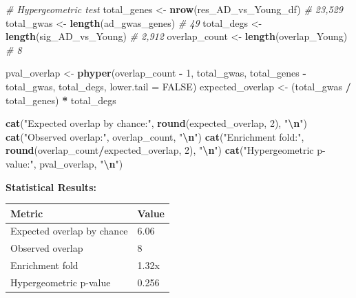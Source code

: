 \documentclass[
]{article}
\newenvironment{Shaded}{\begin{snugshade}}{\end{snugshade}}
\newcommand{\AttributeTok}[1]{\textcolor[rgb]{0.13,0.29,0.53}{#1}}
\newcommand{\CommentTok}[1]{\textcolor[rgb]{0.56,0.35,0.01}{\textit{#1}}}
\newcommand{\ConstantTok}[1]{\textcolor[rgb]{0.56,0.35,0.01}{#1}}
\newcommand{\DecValTok}[1]{\textcolor[rgb]{0.00,0.00,0.81}{#1}}
\newcommand{\FunctionTok}[1]{\textcolor[rgb]{0.13,0.29,0.53}{\textbf{#1}}}
\newcommand{\NormalTok}[1]{#1}
\newcommand{\OtherTok}[1]{\textcolor[rgb]{0.56,0.35,0.01}{#1}}
\newcommand{\SpecialCharTok}[1]{\textcolor[rgb]{0.81,0.36,0.00}{\textbf{#1}}}
\newcommand{\StringTok}[1]{\textcolor[rgb]{0.31,0.60,0.02}{#1}}
\begin{document}
\begin{Shaded}
\begin{Highlighting}[]
\CommentTok{\# Hypergeometric test}
\NormalTok{total\_genes   }\OtherTok{\textless{}{-}} \FunctionTok{nrow}\NormalTok{(res\_AD\_vs\_Young\_df)  }\CommentTok{\# 23,529}
\NormalTok{total\_gwas    }\OtherTok{\textless{}{-}} \FunctionTok{length}\NormalTok{(ad\_gwas\_genes)      }\CommentTok{\# 49}
\NormalTok{total\_degs    }\OtherTok{\textless{}{-}} \FunctionTok{length}\NormalTok{(sig\_AD\_vs\_Young)    }\CommentTok{\# 2,912}
\NormalTok{overlap\_count }\OtherTok{\textless{}{-}} \FunctionTok{length}\NormalTok{(overlap\_Young)      }\CommentTok{\# 8}

\NormalTok{pval\_overlap     }\OtherTok{\textless{}{-}} \FunctionTok{phyper}\NormalTok{(overlap\_count }\SpecialCharTok{{-}} \DecValTok{1}\NormalTok{, total\_gwas,}
\NormalTok{                            total\_genes }\SpecialCharTok{{-}}\NormalTok{ total\_gwas,}
\NormalTok{                            total\_degs, }\AttributeTok{lower.tail =} \ConstantTok{FALSE}\NormalTok{)}
\NormalTok{expected\_overlap }\OtherTok{\textless{}{-}}\NormalTok{ (total\_gwas }\SpecialCharTok{/}\NormalTok{ total\_genes) }\SpecialCharTok{*}\NormalTok{ total\_degs}

\FunctionTok{cat}\NormalTok{(}\StringTok{"Expected overlap by chance:"}\NormalTok{, }\FunctionTok{round}\NormalTok{(expected\_overlap, }\DecValTok{2}\NormalTok{), }\StringTok{"}\SpecialCharTok{\textbackslash{}n}\StringTok{"}\NormalTok{)}
\FunctionTok{cat}\NormalTok{(}\StringTok{"Observed overlap:"}\NormalTok{, overlap\_count, }\StringTok{"}\SpecialCharTok{\textbackslash{}n}\StringTok{"}\NormalTok{)}
\FunctionTok{cat}\NormalTok{(}\StringTok{"Enrichment fold:"}\NormalTok{, }\FunctionTok{round}\NormalTok{(overlap\_count}\SpecialCharTok{/}\NormalTok{expected\_overlap, }\DecValTok{2}\NormalTok{), }\StringTok{"}\SpecialCharTok{\textbackslash{}n}\StringTok{"}\NormalTok{)}
\FunctionTok{cat}\NormalTok{(}\StringTok{"Hypergeometric p{-}value:"}\NormalTok{, pval\_overlap, }\StringTok{"}\SpecialCharTok{\textbackslash{}n}\StringTok{"}\NormalTok{)}
\end{Highlighting}
\end{Shaded}

\textbf{Statistical Results:}

\begin{longtable}[]{@{}ll@{}}
\toprule\noalign{}
Metric & Value \\
\midrule\noalign{}
\endhead
\bottomrule\noalign{}
\endlastfoot
Expected overlap by chance & 6.06 \\
Observed overlap & 8 \\
Enrichment fold & 1.32x \\
Hypergeometric p-value & 0.256 \\
\end{longtable}
\end{document}
